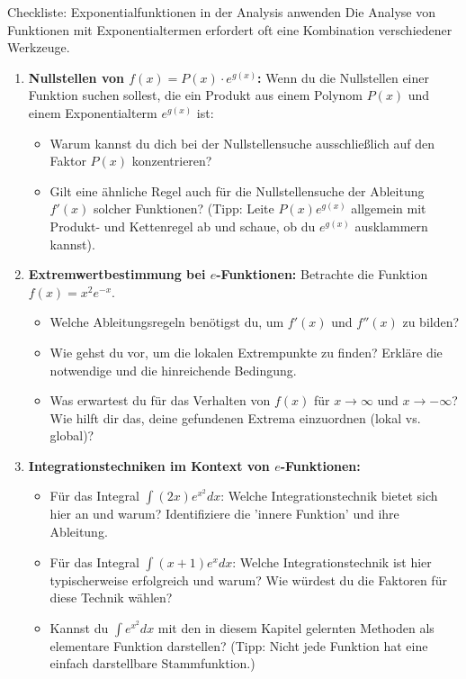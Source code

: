 \begin{aufgabenumgebung}{Checkliste: Exponentialfunktionen in der Analysis anwenden}
Die Analyse von Funktionen mit Exponentialtermen erfordert oft eine Kombination verschiedener Werkzeuge.

\begin{enumerate}[label=(\alph*)]
    \item \textbf{Nullstellen von $f(x) = P(x) \cdot e^{g(x)}$:}
    Wenn du die Nullstellen einer Funktion suchen sollest, die ein Produkt aus einem Polynom $P(x)$ und einem Exponentialterm $e^{g(x)}$ ist:
    \begin{itemize}
        \item Warum kannst du dich bei der Nullstellensuche ausschließlich auf den Faktor $P(x)$ konzentrieren?
        \item Gilt eine ähnliche Regel auch für die Nullstellensuche der Ableitung $f'(x)$ solcher Funktionen? (Tipp: Leite $P(x)e^{g(x)}$ allgemein mit Produkt- und Kettenregel ab und schaue, ob du $e^{g(x)}$ ausklammern kannst).
    \end{itemize}
    \item \textbf{Extremwertbestimmung bei $e$-Funktionen:}
    Betrachte die Funktion $f(x) = x^2 e^{-x}$.
    \begin{itemize}
        \item Welche Ableitungsregeln benötigst du, um $f'(x)$ und $f''(x)$ zu bilden?
        \item Wie gehst du vor, um die lokalen Extrempunkte zu finden? Erkläre die notwendige und die hinreichende Bedingung.
        \item Was erwartest du für das Verhalten von $f(x)$ für $x \to \infty$ und $x \to -\infty$? Wie hilft dir das, deine gefundenen Extrema einzuordnen (lokal vs. global)?
    \end{itemize}
    \item \textbf{Integrationstechniken im Kontext von $e$-Funktionen:}
    \begin{itemize}
        \item Für das Integral $\int (2x) e^{x^2} dx$: Welche Integrationstechnik bietet sich hier an und warum? Identifiziere die 'innere Funktion' und ihre Ableitung.
        \item Für das Integral $\int (x+1) e^x dx$: Welche Integrationstechnik ist hier typischerweise erfolgreich und warum? Wie würdest du die Faktoren für diese Technik wählen?
        \item Kannst du $\int e^{x^2} dx$ mit den in diesem Kapitel gelernten Methoden als elementare Funktion darstellen? (Tipp: Nicht jede Funktion hat eine einfach darstellbare Stammfunktion.)

\end{itemize}
\end{enumerate}
\end{aufgabenumgebung}
